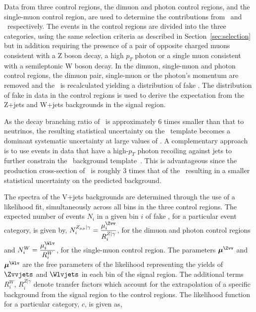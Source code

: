 Data from three control regions, the dimuon and photon control regions, and the
single-muon control region, are used to determine the contributions from
\Zvvjets~and \Wlvjets~respectively. The events in the control regions are
divided into the three  categories, using the same selection criteria as
described in Section~\ref{sec:selection} but in addition requiring the presence
of a pair of opposite charged muons consistent with a Z boson decay, a high
$p_{T}$ photon or a single muon consistent with a semileptonic W boson decay.
In the dimuon, single-muon and photon control regions, the dimuon pair,
single-muon or the photon's momentum are removed and the \ETm ~is recalculated
yielding a distribution of fake \ETm. The distribution of fake \ETm in data in
the control regions is used to derive the expectation from the Z+jets and W+jets
backgrounds in the signal region.

As the decay branching ratio of \Zmm~is approximately 6 times smaller than that
to neutrinos, the resulting statistical uncertainty on the \Zvvjets~template
becomes a dominant systematic uncertainty at large values of \ETm.  A
complementary approach is to use events in data that have a high-$p_{T}$ photon
recoiling against jets to further constrain the \Zvvjets~background
template~\cite{CMS-PAS-SUS-08-002}. This is advantageous since the production
cross-section of \phojets~is roughly 3 times that of the \Zvvjets~resulting in a
smaller statistical uncertainty on the predicted background. 
 
The \ETm spectra of the V+jets backgrounds are determined through the use of a
likelihood fit, simultaneously across all bins in the three control regions.
The expected number of events $N_{i}$ in a given bin $i$ of fake \ETm, for a
particular event category, is given by, $N^{Z_{\mu\mu}|\gamma }_{i}=
\dfrac{{\mu^{\Zvv}_{i}}}{R^{Z|\gamma}_{i}}$, for the dimuon and photon control
regions and  $N^{W}_{i} =  \dfrac{{\mu^{\Wlv}_{i}}}{R^{W}_{i}}$, for the
single-muon control region. The parameters $\boldsymbol{\mu}^{\Zvv}$ and
$\boldsymbol{\mu}^{\Wlv}$ are the free parameters of the likelihood representing
the yields of $\Zvvjets$ and $\Wlvjets$ in each bin of the signal region. The
additional terms  $R^{W}_{i}$, $R^{Z|\gamma}_{i}$ denote transfer factors which
account for the extrapolation of a specific background from the signal region to
the control regions. The likelihood function for a particular category, $c$, is
given as,   

